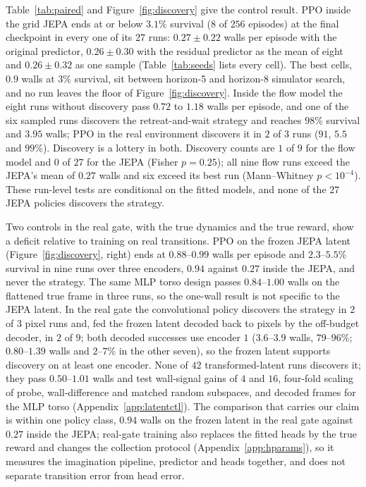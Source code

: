 Table~\ref{tab:paired} and Figure~\ref{fig:discovery} give the control result. PPO inside the grid
JEPA ends at or below $3.1\%$ survival ($8$ of $256$ episodes) at the final checkpoint in every one of its $27$ runs: $0.27\pm0.22$ walls per episode with
the original predictor, $0.26\pm0.30$ with the residual predictor as the mean of eight and
$0.26\pm0.32$ as one sample (Table~\ref{tab:seeds} lists every cell). The best cells, $0.9$ walls at $3\%$ survival, sit between horizon-5 and horizon-8 simulator search, and no run leaves the floor of Figure~\ref{fig:discovery}. Inside the flow model the eight runs without discovery pass $0.72$ to $1.18$ walls per episode, and one of the six sampled runs discovers the
retreat-and-wait strategy and reaches $98\%$ survival and $3.95$ walls; PPO in the real environment
discovers it in $2$ of $3$ runs ($91$, $5.5$ and $99\%$). Discovery is a lottery in both. Discovery counts are $1$ of $9$ for the flow model and $0$ of $27$ for the JEPA (Fisher $p=0.25$); all nine flow runs exceed the JEPA's mean of $0.27$ walls and six exceed its best run (Mann--Whitney $p<10^{-4}$). These run-level tests are conditional on the fitted models, and none of the $27$ JEPA policies discovers the strategy.

Two controls in the real gate, with the true dynamics and the true reward, show a deficit relative to training on real transitions. PPO on the frozen JEPA latent (Figure~\ref{fig:discovery}, right) ends at $0.88$--$0.99$ walls per episode and $2.3$--$5.5\%$ survival in nine runs over three encoders, $0.94$ against $0.27$ inside the JEPA, and never the strategy. The same MLP torso design passes $0.84$--$1.00$ walls on the flattened true frame in three runs, so the one-wall result is not specific to the JEPA latent. In the real gate the convolutional policy discovers the strategy in $2$ of $3$ pixel runs and, fed the frozen latent decoded back to pixels by the off-budget decoder, in $2$ of $9$; both decoded successes use encoder $1$ ($3.6$--$3.9$ walls, $79$--$96\%$; $0.80$--$1.39$ walls and $2$--$7\%$ in the other seven), so the frozen latent supports discovery on at least one encoder. None of $42$ transformed-latent runs discovers it; they pass $0.50$--$1.01$ walls and test wall-signal gains of $4$ and $16$, four-fold scaling of probe, wall-difference and matched random subspaces, and decoded frames for the MLP torso (Appendix~\ref{app:latentctl}). The comparison that carries our claim is within one policy class, $0.94$ walls on the frozen latent in the real gate against $0.27$ inside the JEPA; real-gate training also replaces the fitted heads by the true reward and changes the collection protocol (Appendix~\ref{app:hparams}), so it measures the imagination pipeline, predictor and heads together, and does not separate transition error from head error.

